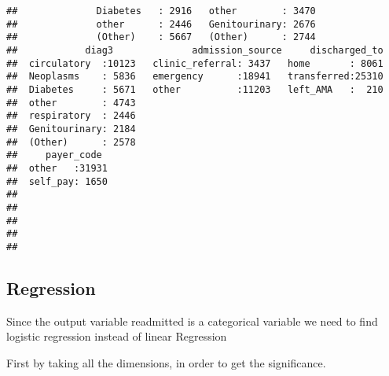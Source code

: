 \documentclass[]{article}
\newenvironment{Shaded}{\begin{snugshade}}{\end{snugshade}}
\newcommand{\KeywordTok}[1]{\textcolor[rgb]{0.13,0.29,0.53}{\textbf{#1}}}
\newcommand{\DecValTok}[1]{\textcolor[rgb]{0.00,0.00,0.81}{#1}}
\newcommand{\StringTok}[1]{\textcolor[rgb]{0.31,0.60,0.02}{#1}}
\newcommand{\OperatorTok}[1]{\textcolor[rgb]{0.81,0.36,0.00}{\textbf{#1}}}
\newcommand{\NormalTok}[1]{#1}
\begin{document}
\begin{verbatim}
##              Diabetes   : 2916   other        : 3470  
##              other      : 2446   Genitourinary: 2676  
##              (Other)    : 5667   (Other)      : 2744  
##            diag3              admission_source     discharged_to  
##  circulatory  :10123   clinic_referral: 3437   home       : 8061  
##  Neoplasms    : 5836   emergency      :18941   transferred:25310  
##  Diabetes     : 5671   other          :11203   left_AMA   :  210  
##  other        : 4743                                              
##  respiratory  : 2446                                              
##  Genitourinary: 2184                                              
##  (Other)      : 2578                                              
##     payer_code   
##  other   :31931  
##  self_pay: 1650  
##                  
##                  
##                  
##                  
## 
\end{verbatim}

\subsection{Regression}\label{regression}

Since the output variable readmitted is a categorical variable we need
to find logistic regression instead of linear Regression

First by taking all the dimensions, in order to get the significance.

\begin{Shaded}
\end{Shaded}
\end{document}
